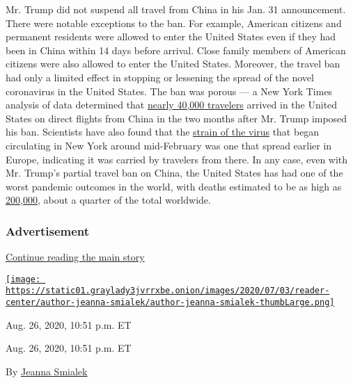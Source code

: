 Mr. Trump did not suspend all travel from China in his Jan. 31
announcement. There were notable exceptions to the ban. For example,
American citizens and permanent residents were allowed to enter the
United States even if they had been in China within 14 days before
arrival. Close family members of American citizens were also allowed to
enter the United States. Moreover, the travel ban had only a limited
effect in stopping or lessening the spread of the novel coronavirus in
the United States. The ban was porous --- a New York Times analysis of
data determined that
\href{https://slack-redir.net/link?url=https\%3A\%2F\%2Fwww.nytimes3xbfgragh.onion\%2F2020\%2F04\%2F04\%2Fus\%2Fcoronavirus-china-travel-restrictions.html}{nearly
40,000 travelers} arrived in the United States on direct flights from
China in the two months after Mr. Trump imposed his ban. Scientists have
also found that the
\href{https://slack-redir.net/link?url=https\%3A\%2F\%2Fwww.nytimes3xbfgragh.onion\%2F2020\%2F04\%2F08\%2Fscience\%2Fnew-york-coronavirus-cases-europe-genomes.html}{strain
of the virus} that began circulating in New York around mid-February was
one that spread earlier in Europe, indicating it was carried by
travelers from there. In any case, even with Mr. Trump's partial travel
ban on China, the United States has had one of the worst pandemic
outcomes in the world, with deaths estimated to be as high as
\href{https://slack-redir.net/link?url=https\%3A\%2F\%2Fwww.nytimes3xbfgragh.onion\%2Finteractive\%2F2020\%2F08\%2F12\%2Fus\%2Fcovid-deaths-us.html}{200,000},
about a quarter of the total worldwide.

\hypertarget{advertisement-4}{%
\subsubsection{Advertisement}\label{advertisement-4}}

\protect\hyperlink{after-dfp-ad-mid5}{Continue reading the main story}

\href{https://www.nytimes3xbfgragh.onion/by/jeanna-smialek}{\texttt{[image: https://static01.graylady3jvrrxbe.onion/images/2020/07/03/reader-center/author-jeanna-smialek/author-jeanna-smialek-thumbLarge.png]}}

Aug. 26, 2020, 10:51 p.m. ET

Aug. 26, 2020, 10:51 p.m. ET

By \href{https://www.nytimes3xbfgragh.onion/by/jeanna-smialek}{Jeanna
Smialek}

